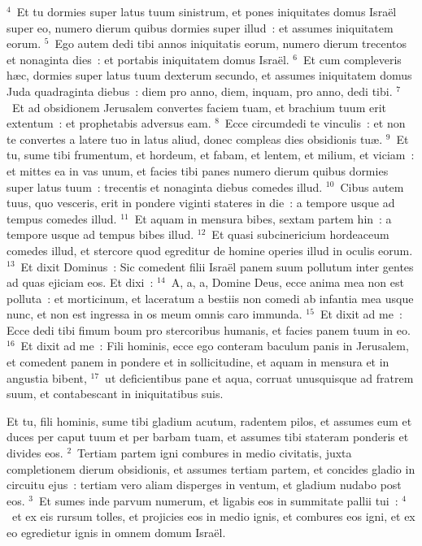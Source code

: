 ${}^{4}$~Et tu dormies super latus tuum sinistrum, et pones iniquitates domus Isra\"el super eo, numero dierum quibus dormies super illud~: et assumes iniquitatem eorum.
${}^{5}$~Ego autem dedi tibi annos iniquitatis eorum, numero dierum trecentos et nonaginta dies~: et portabis iniquitatem domus Isra\"el.
${}^{6}$~Et cum compleveris h\ae c, dormies super latus tuum dexterum secundo, et assumes iniquitatem domus Juda quadraginta diebus~: diem pro anno, diem, inquam, pro anno, dedi tibi.
${}^{7}$~Et ad obsidionem Jerusalem convertes faciem tuam, et brachium tuum erit extentum~: et prophetabis adversus eam.
${}^{8}$~Ecce circumdedi te vinculis~: et non te convertes a latere tuo in latus aliud, donec compleas dies obsidionis tu\ae .
${}^{9}$~Et tu, sume tibi frumentum, et hordeum, et fabam, et lentem, et milium, et viciam~: et mittes ea in vas unum, et facies tibi panes numero dierum quibus dormies super latus tuum~: trecentis et nonaginta diebus comedes illud.
${}^{10}$~Cibus autem tuus, quo vesceris, erit in pondere viginti stateres in die~: a tempore usque ad tempus comedes illud.
${}^{11}$~Et aquam in mensura bibes, sextam partem hin~: a tempore usque ad tempus bibes illud.
${}^{12}$~Et quasi subcinericium hordeaceum comedes illud, et stercore quod egreditur de homine operies illud in oculis eorum.
${}^{13}$~Et dixit Dominus~: Sic comedent filii Isra\"el panem suum pollutum inter gentes ad quas ejiciam eos. Et dixi~:
${}^{14}$~A, a, a, Domine Deus, ecce anima mea non est polluta~: et morticinum, et laceratum a bestiis non comedi ab infantia mea usque nunc, et non est ingressa in os meum omnis caro immunda.
${}^{15}$~Et dixit ad me~: Ecce dedi tibi fimum boum pro stercoribus humanis, et facies panem tuum in eo.
${}^{16}$~Et dixit ad me~: Fili hominis, ecce ego conteram baculum panis in Jerusalem, et comedent panem in pondere et in sollicitudine, et aquam in mensura et in angustia bibent,
${}^{17}$~ut deficientibus pane et aqua, corruat unusquisque ad fratrem suum, et contabescant in iniquitatibus suis.

\lettrine[lines=10,image=true,loversize=0.05,lraise=-0.03]{E}{}t tu, fili hominis, sume tibi gladium acutum, radentem pilos, et assumes eum et duces per caput tuum et per barbam tuam, et assumes tibi stateram ponderis et divides eos.
${}^{2}$~Tertiam partem igni combures in medio civitatis, juxta completionem dierum obsidionis, et assumes tertiam partem, et concides gladio in circuitu ejus~: tertiam vero aliam disperges in ventum, et gladium nudabo post eos.
${}^{3}$~Et sumes inde parvum numerum, et ligabis eos in summitate pallii tui~:
${}^{4}$~et ex eis rursum tolles, et projicies eos in medio ignis, et combures eos igni, et ex eo egredietur ignis in omnem domum Isra\"el.


